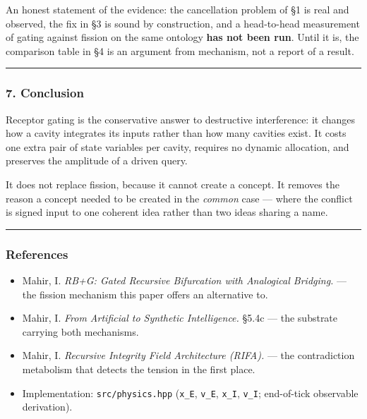 \documentclass[
  11pt,
  a4paper,
]{article}
\providecommand{\tightlist}{%
  \setlength{\itemsep}{0pt}\setlength{\parskip}{0pt}}
\begin{document}
An honest statement of the evidence: the cancellation problem of §1 is
real and observed, the fix in §3 is sound by construction, and a
head-to-head measurement of gating against fission on the same ontology
\textbf{has not been run}. Until it is, the comparison table in §4 is an
argument from mechanism, not a report of a result.

\begin{center}\rule{0.5\linewidth}{0.5pt}\end{center}

\subsubsection{7. Conclusion}\label{conclusion-6}

Receptor gating is the conservative answer to destructive interference:
it changes how a cavity integrates its inputs rather than how many
cavities exist. It costs one extra pair of state variables per cavity,
requires no dynamic allocation, and preserves the amplitude of a driven
query.

It does not replace fission, because it cannot create a concept. It
removes the reason a concept needed to be created in the \emph{common}
case --- where the conflict is signed input to one coherent idea rather
than two ideas sharing a name.

\begin{center}\rule{0.5\linewidth}{0.5pt}\end{center}

\subsubsection{References}\label{references-4}

\begin{itemize}
\tightlist
\item
  Mahir, I. \emph{RB+G: Gated Recursive Bifurcation with Analogical
  Bridging.} --- the fission mechanism this paper offers an alternative
  to.
\item
  Mahir, I. \emph{From Artificial to Synthetic Intelligence.} §5.4c ---
  the substrate carrying both mechanisms.
\item
  Mahir, I. \emph{Recursive Integrity Field Architecture (RIFA).} ---
  the contradiction metabolism that detects the tension in the first
  place.
\item
  Implementation: \texttt{src/physics.hpp} (\texttt{x\_E},
  \texttt{v\_E}, \texttt{x\_I}, \texttt{v\_I}; end-of-tick observable
  derivation).
\end{itemize}
\end{document}
